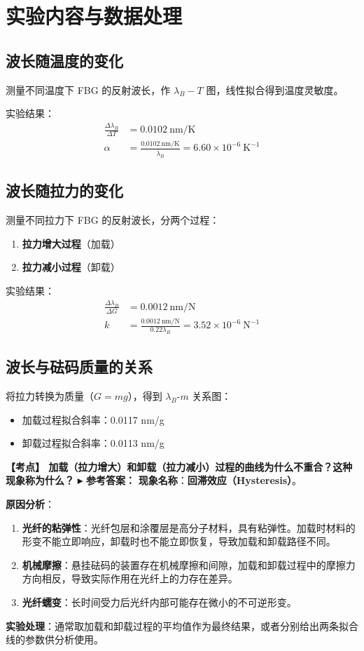 \documentclass[12pt,a4paper]{article}
\newcommand{\hl}[1]{\textbf{\color{red}#1}}
\newcommand{\exam}[1]{\textbf{\color{blue!70!black}【考点】#1}}
\newcommand{\answer}[1]{\vspace{2pt}\noindent\textbf{\color{teal!80!black}▸ 参考答案：}#1\vspace{4pt}}
\newcommand{\qa}[2]{\exam{#1}\answer{#2}}
\begin{document}
\section{实验内容与数据处理}

\subsection{波长随温度的变化}
测量不同温度下 FBG 的反射波长，作 \(\lambda_B-T\) 图，线性拟合得到温度灵敏度。

实验结果：
\begin{align}
    \frac{\Delta \lambda_B}{\Delta T} &= 0.0102\ \text{nm/K} \\
    \alpha &= \frac{0.0102\ \text{nm/K}}{\bar{\lambda}_B} = 6.60 \times 10^{-6}\ \text{K}^{-1}
\end{align}

\subsection{波长随拉力的变化}
测量不同拉力下 FBG 的反射波长，分两个过程：
\begin{enumerate}
    \item \textbf{拉力增大过程}（加载）
    \item \textbf{拉力减小过程}（卸载）
\end{enumerate}

实验结果：
\begin{align}
    \frac{\Delta \lambda_B}{\Delta G} &= 0.0012\ \text{nm/N} \\
    k &= \frac{0.0012\ \text{nm/N}}{0.22\lambda_B} = 3.52 \times 10^{-6}\ \text{N}^{-1}
\end{align}

\subsection{波长与砝码质量的关系}
将拉力转换为质量（\(G = mg\)），得到 \(\lambda_B\)-\(m\) 关系图：
\begin{itemize}
    \item 加载过程拟合斜率：0.0117 nm/g
    \item 卸载过程拟合斜率：0.0113 nm/g
\end{itemize}

\qa{
    加载（拉力增大）和卸载（拉力减小）过程的曲线为什么不重合？这种现象称为什么？
}{
    \textbf{现象名称}：\hl{回滞效应（Hysteresis）}。

    \textbf{原因分析}：
    \begin{enumerate}
        \item \textbf{光纤的粘弹性}：光纤包层和涂覆层是高分子材料，具有粘弹性。加载时材料的形变不能立即响应，卸载时也不能立即恢复，导致加载和卸载路径不同。
        \item \textbf{机械摩擦}：悬挂砝码的装置存在机械摩擦和间隙，加载和卸载过程中的摩擦力方向相反，导致实际作用在光纤上的力存在差异。
        \item \textbf{光纤蠕变}：长时间受力后光纤内部可能存在微小的不可逆形变。
    \end{enumerate}
    \textbf{实验处理}：通常取加载和卸载过程的平均值作为最终结果，或者分别给出两条拟合线的参数供分析使用。
}
\end{document}
